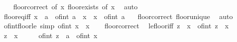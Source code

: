 \begin{isabellebody}
%
\isadelimproof
\ \ %
\endisadelimproof
%
\isatagproof
{}\isamarkupfalse%
\ floor{\isacharunderscore}{\kern0pt}correct\ {\isacharbrackleft}{\kern0pt}of\ x{\isacharbrackright}{\kern0pt}\ floor{\isacharunderscore}{\kern0pt}exists{}\ {\isacharbrackleft}{\kern0pt}of\ x{\isacharbrackright}{\kern0pt}\ \isamarkupfalse%
\ auto%
\endisatagproof
{\isafoldproof}%
%
\isadelimproof
\isanewline
%
\endisadelimproof
\isanewline
{}\isamarkupfalse%
\ floor{\isacharunderscore}{\kern0pt}eq{\isacharunderscore}{\kern0pt}iff{\isacharcolon}{\kern0pt}\ {\isachardoublequoteopen}{\isasymlfloor}x{\isasymrfloor}\ {\isacharequal}{\kern0pt}\ a\ {\isasymlongleftrightarrow}\ of{\isacharunderscore}{\kern0pt}int\ a\ {\isasymle}\ x\ {\isasymand}\ x\ {\isacharless}{\kern0pt}\ of{\isacharunderscore}{\kern0pt}int\ a\ {\isacharplus}{\kern0pt}\ {}{\isachardoublequoteclose}\isanewline
%
\isadelimproof
%
\endisadelimproof
%
\isatagproof
{}\isamarkupfalse%
\ floor{\isacharunderscore}{\kern0pt}correct\ floor{\isacharunderscore}{\kern0pt}unique\ \isamarkupfalse%
\ auto%
\endisatagproof
{\isafoldproof}%
%
\isadelimproof
\isanewline
%
\endisadelimproof
\isanewline
{}\isamarkupfalse%
\ of{\isacharunderscore}{\kern0pt}int{\isacharunderscore}{\kern0pt}floor{\isacharunderscore}{\kern0pt}le\ {\isacharbrackleft}{\kern0pt}simp{\isacharbrackright}{\kern0pt}{\isacharcolon}{\kern0pt}\ {\isachardoublequoteopen}of{\isacharunderscore}{\kern0pt}int\ {\isasymlfloor}x{\isasymrfloor}\ {\isasymle}\ x{\isachardoublequoteclose}\isanewline
%
\isadelimproof
\ \ %
\endisadelimproof
%
\isatagproof
{}\isamarkupfalse%
\ floor{\isacharunderscore}{\kern0pt}correct\ \isacommand{{\isachardot}{\kern0pt}{\isachardot}{\kern0pt}}\isamarkupfalse%
%
\endisatagproof
{\isafoldproof}%
%
\isadelimproof
\isanewline
%
\endisadelimproof
\isanewline
{}\isamarkupfalse%
\ le{\isacharunderscore}{\kern0pt}floor{\isacharunderscore}{\kern0pt}iff{\isacharcolon}{\kern0pt}\ {\isachardoublequoteopen}z\ {\isasymle}\ {\isasymlfloor}x{\isasymrfloor}\ {\isasymlongleftrightarrow}\ of{\isacharunderscore}{\kern0pt}int\ z\ {\isasymle}\ x{\isachardoublequoteclose}\isanewline
%
\isadelimproof
%
\endisadelimproof
%
\isatagproof
{}\isamarkupfalse%
\isanewline
\ \ \isamarkupfalse%
\ {\isachardoublequoteopen}z\ {\isasymle}\ {\isasymlfloor}x{\isasymrfloor}{\isachardoublequoteclose}\isanewline
\ \ \isamarkupfalse%
\ \isamarkupfalse%
\ {\isachardoublequoteopen}{\isacharparenleft}{\kern0pt}of{\isacharunderscore}{\kern0pt}int\ z\ {\isacharcolon}{\kern0pt}{\isacharcolon}{\kern0pt}\ {\isacharprime}{\kern0pt}a{\isacharparenright}{\kern0pt}\ {\isasymle}\ of{\isacharunderscore}{\kern0pt}int\ {\isasymlfloor}x{\isasymrfloor}{\isachardoublequoteclose}\ \isamarkupfalse%

\end{isabellebody}

